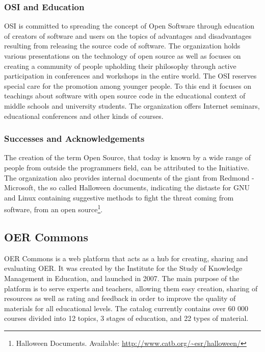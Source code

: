 \documentclass[a4paper]{article}
\begin{document}
\subsubsection{OSI and Education}
OSI is committed to spreading the concept of Open Software through education of creators of software and users on the topics of advantages and disadvantages resulting from releasing the source code of software. The organization holds various presentations on the technology of open source as well as focuses on creating a community of people upholding their philosophy through active participation in conferences and workshops in the entire world. The OSI reserves special care for the promotion among younger people. To this end it focuses on teachings about software with open source code in the educational context of middle schools and university students. The organization offers Internet seminars, educational conferences and other kinds of courses. 

\subsubsection{Successes and Acknowledgements}
The creation of the term Open Source, that today is known by a wide range of people from outside the programmers field, can be attributed to the Initiative. The organization also provides internal documents of the giant from Redmond - Microsoft, the so called Halloween documents, indicating the distaste for GNU and Linux containing suggestive methods to fight the threat coming from software, from an open source\footnote{Halloween Documents. Available: \url{http://www.catb.org/~esr/halloween/}}.

\subsection{OER Commons} 
OER Commons is a web platform that acts as a hub for creating, sharing and evaluating OER. It was created by the Institute for the Study of Knowledge Management in Education, and launched in 2007. The main purpose of the platform is to serve experts and teachers, allowing them easy creation, sharing of resources as well as rating and feedback in order to improve the quality of materials for all educational levels. The catalog currently contains over 60 000 courses divided into 12 topics, 3 stages of education, and 22 types of material.\\ 
\end{document}
